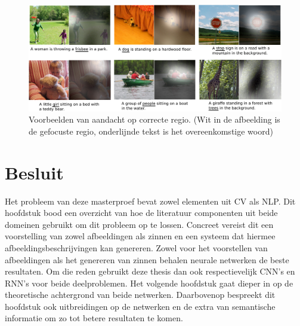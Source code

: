 \begin{figure}[tb]
	\centering
	\includegraphics[width=\linewidth]{Images/good_Xu.pdf}
	\caption[Voorbeelden van aandacht op correcte regio.]{Voorbeelden van aandacht op correcte regio. (Wit in de afbeelding is de gefocuste regio, onderlijnde tekst is het overeenkomstige woord)~\cite{Xu2015}}
	\label{fig:attention-example}
\end{figure}


\section{Besluit}
Het probleem van deze masterproef bevat zowel elementen uit CV als NLP. Dit hoofdstuk bood een overzicht van hoe de literatuur componenten uit beide domeinen gebruikt om dit probleem op te lossen. Concreet vereist dit een voorstelling van zowel afbeeldingen als zinnen en een systeem dat hiermee afbeeldingsbeschrijvingen kan genereren. Zowel voor het voorstellen van afbeeldingen als het genereren van zinnen behalen neurale netwerken de beste resultaten. Om die reden gebruikt deze thesis dan ook respectievelijk CNN's en RNN's voor beide deelproblemen. Het volgende hoofdstuk gaat dieper in op de theoretische achtergrond van beide netwerken. Daarbovenop bespreekt dit hoofdstuk ook uitbreidingen op de netwerken en de extra van semantische informatie om zo tot betere resultaten te komen.

